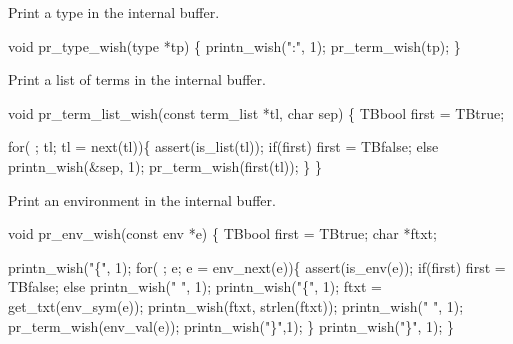 
Print a type in the internal buffer.

\nwenddocs{}\endmoddef\let\nwnotused=\nwoutput{}\nwstartdeflinemarkup{}\nwenddeflinemarkup
void pr_type_wish(type *tp)
\{
  printn_wish(":", 1); 
  pr_term_wish(tp);
\}
\nwendcode{}\nwdocspar


Print a list of terms in the internal buffer.

\nwenddocs{}\endmoddef\let\nwnotused=\nwoutput{}\nwstartdeflinemarkup{}\nwenddeflinemarkup
void pr_term_list_wish(const term_list *tl, char sep)
\{
  TBbool first = TBtrue;

  for( ; tl; tl = next(tl))\{
    assert(is_list(tl));    
    if(first)
      first = TBfalse;
    else
      printn_wish(&sep, 1);
    pr_term_wish(first(tl));
  \}
\}
\nwendcode{}\nwdocspar


Print an environment in the internal buffer.

\nwenddocs{}\endmoddef\let\nwnotused=\nwoutput{}\nwstartdeflinemarkup{}\nwenddeflinemarkup
void pr_env_wish(const env *e)
\{
  TBbool first = TBtrue;
  char *ftxt;

  printn_wish("\{", 1);
  for( ; e; e = env_next(e))\{
    assert(is_env(e));    
    if(first)
      first = TBfalse;
    else
      printn_wish(" ", 1);
    printn_wish("\{", 1);
    ftxt = get_txt(env_sym(e));
    printn_wish(ftxt, strlen(ftxt));
    printn_wish(" ", 1);
    pr_term_wish(env_val(e));
    printn_wish("\}",1);
  \}
  printn_wish("\}", 1);
\}
\nwendcode{}\nwdocspar


